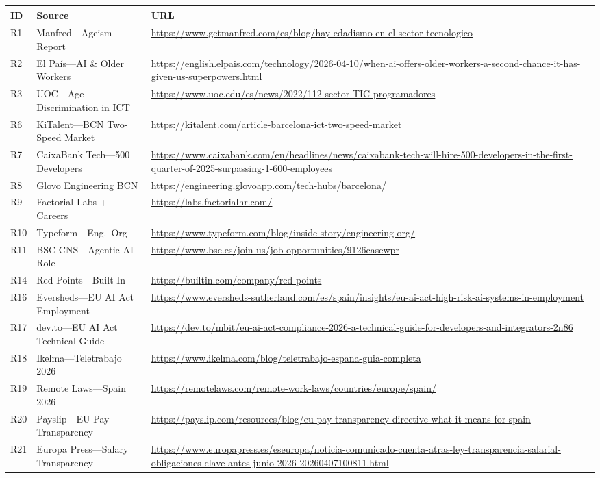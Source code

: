 \documentclass[a4paper,11pt,openany]{report}
\begin{document}
{\small
\begin{longtable}{l p{5cm} p{6.5cm}}
\toprule
\textbf{ID} & \textbf{Source} & \textbf{URL} \\
\midrule
\endhead
R1  & Manfred---Ageism Report & \url{https://www.getmanfred.com/es/blog/hay-edadismo-en-el-sector-tecnologico} \\
R2  & El País---AI \& Older Workers & \url{https://english.elpais.com/technology/2026-04-10/when-ai-offers-older-workers-a-second-chance-it-has-given-us-superpowers.html} \\
R3  & UOC---Age Discrimination in ICT & \url{https://www.uoc.edu/es/news/2022/112-sector-TIC-programadores} \\
R6  & KiTalent---BCN Two-Speed Market & \url{https://kitalent.com/article-barcelona-ict-two-speed-market} \\
R7  & CaixaBank Tech---500 Developers & \url{https://www.caixabank.com/en/headlines/news/caixabank-tech-will-hire-500-developers-in-the-first-quarter-of-2025-surpassing-1-600-employees} \\
R8  & Glovo Engineering BCN & \url{https://engineering.glovoapp.com/tech-hubs/barcelona/} \\
R9  & Factorial Labs + Careers & \url{https://labs.factorialhr.com/} \\
R10 & Typeform---Eng.\ Org & \url{https://www.typeform.com/blog/inside-story/engineering-org/} \\
R11 & BSC-CNS---Agentic AI Role & \url{https://www.bsc.es/join-us/job-opportunities/9126casewpr} \\
R14 & Red Points---Built In & \url{https://builtin.com/company/red-points} \\
R16 & Eversheds---EU AI Act Employment & \url{https://www.eversheds-sutherland.com/es/spain/insights/eu-ai-act-high-risk-ai-systems-in-employment} \\
R17 & dev.to---EU AI Act Technical Guide & \url{https://dev.to/mbit/eu-ai-act-compliance-2026-a-technical-guide-for-developers-and-integrators-2n86} \\
R18 & Ikelma---Teletrabajo 2026 & \url{https://www.ikelma.com/blog/teletrabajo-espana-guia-completa} \\
R19 & Remote Laws---Spain 2026 & \url{https://remotelaws.com/remote-work-laws/countries/europe/spain/} \\
R20 & Payslip---EU Pay Transparency & \url{https://payslip.com/resources/blog/eu-pay-transparency-directive-what-it-means-for-spain} \\
R21 & Europa Press---Salary Transparency & \url{https://www.europapress.es/eseuropa/noticia-comunicado-cuenta-atras-ley-transparencia-salarial-obligaciones-clave-antes-junio-2026-20260407100811.html} \\

\end{longtable}}
\end{document}
